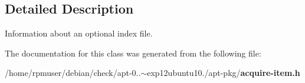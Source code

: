 \subsection{\-Detailed \-Description}
\-Information about an optional index file. 

\-The documentation for this class was generated from the following file\-:\begin{DoxyCompactItemize}
\item 
/home/rpmuser/debian/check/apt-\/0..$\sim$exp12ubuntu10./apt-\/pkg/{\bf acquire-\/item.\-h}\end{DoxyCompactItemize}
